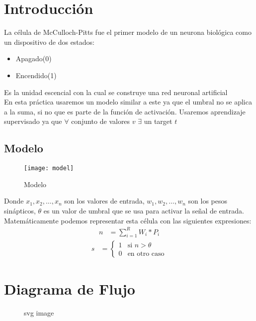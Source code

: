\documentclass{article}
\begin{document}
\maketitle
\tableofcontents
\section{Introducción}
La célula de McCulloch-Pitts fue el primer modelo de un neurona biológica como un dispositivo de dos estados:
\begin{itemize}
	\item Apagado(0)
	\item Encendido(1)
\end{itemize}
Es la unidad escencial con la cual se construye una red neuronal artificial\\
En esta práctica usaremos un modelo similar a este ya que el umbral no se aplica a la suma, si no que es parte de la función de activación. Usaremos aprendizaje supervisado ya que $\forall$ conjunto de valores $v$ $\exists$ un target $t$
\subsection{Modelo}
\begin{figure}[h!]
	\caption{Modelo}
	\centering
	\texttt{[image: model]}
\end{figure}
Donde $x_1, x_2,\ldots, x_n$ son los valores de entrada, $w_1, w_2,\ldots, w_n$ son los pesos sinápticos, $\theta$ es un valor de umbral que se usa para activar la señal de entrada.\\
Matemáticamente podemos representar esta célula con las siguientes expresiones:\\
\begin{align}
	n &= \sum_{i=1}^{R}W_i*P_i
\end{align}
\begin{align}
	s &{}=\displaystyle
	\begin{cases}
		1 &\text{si } n > \theta\\
		0 &\text{en otro caso}
	\end{cases}
\end{align}
\section{Diagrama de Flujo}
\begin{figure}[htbp]
	\centering
	
	\caption{svg image}
\end{figure}
\end{document}
